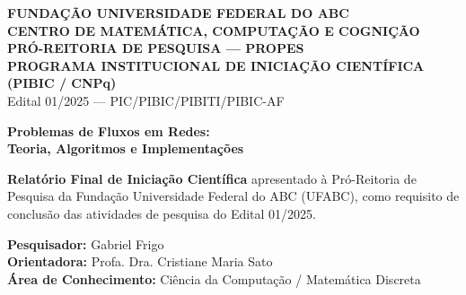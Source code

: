 \thispagestyle{empty}

\begin{center}
    {\large\textbf{FUNDAÇÃO UNIVERSIDADE FEDERAL DO ABC}}\\[0.15cm]
    {\large\textbf{CENTRO DE MATEMÁTICA, COMPUTAÇÃO E COGNIÇÃO}}\\[0.15cm]
    {\textbf{PRÓ-REITORIA DE PESQUISA --- PROPES}}\\[0.1cm]
    {\small\textbf{PROGRAMA INSTITUCIONAL DE INICIAÇÃO CIENTÍFICA (PIBIC / CNPq)}}\\[0.1cm]
    {\footnotesize Edital 01/2025 --- PIC/PIBIC/PIBITI/PIBIC-AF}
\end{center}

\vspace{1.0cm}

\begin{center}
    {\LARGE\textbf{Problemas de Fluxos em Redes:}}\\[0.3cm]
    {\Large\textbf{Teoria, Algoritmos e Implementações}}\par
\end{center}

\vspace{0.8cm}

\begin{flushright}
\begin{minipage}{0.6\textwidth}
\small
{}
\textbf{Relatório Final de Iniciação Científica} apresentado à Pró-Reitoria de Pesquisa da Fundação Universidade Federal do ABC (UFABC), como requisito de conclusão das atividades de pesquisa do Edital 01/2025.\par
\vspace{0.3cm}
\textbf{Pesquisador:} Gabriel Frigo\\
\textbf{Orientadora:} Profa. Dra. Cristiane Maria Sato\\
\textbf{Área de Conhecimento:} Ciência da Computação / Matemática Discreta
\end{minipage}
\end{flushright}

\vspace{0.8cm}

